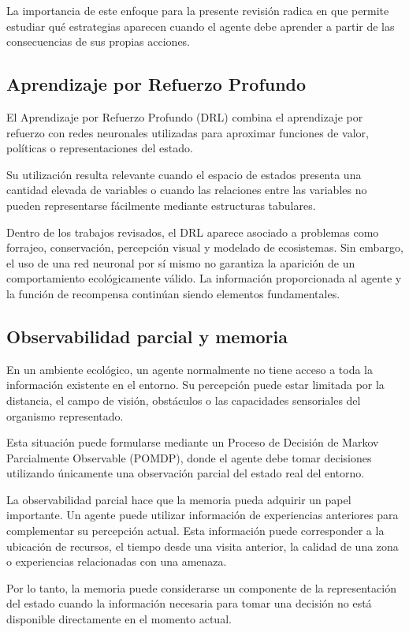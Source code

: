 \documentclass[conference]{IEEEtran}
\begin{document}
La importancia de este enfoque para la presente revisión radica en que
permite estudiar qué estrategias aparecen cuando el agente debe aprender
a partir de las consecuencias de sus propias acciones.

\subsection{Aprendizaje por Refuerzo Profundo}

El Aprendizaje por Refuerzo Profundo (DRL) combina el aprendizaje por
refuerzo con redes neuronales utilizadas para aproximar funciones de
valor, políticas o representaciones del estado.

Su utilización resulta relevante cuando el espacio de estados presenta
una cantidad elevada de variables o cuando las relaciones entre las
variables no pueden representarse fácilmente mediante estructuras
tabulares.

Dentro de los trabajos revisados, el DRL aparece asociado a problemas
como forrajeo, conservación, percepción visual y modelado de ecosistemas.
Sin embargo, el uso de una red neuronal por sí mismo no garantiza la
aparición de un comportamiento ecológicamente válido. La información
proporcionada al agente y la función de recompensa continúan siendo
elementos fundamentales.

\subsection{Observabilidad parcial y memoria}

En un ambiente ecológico, un agente normalmente no tiene acceso a toda la
información existente en el entorno. Su percepción puede estar limitada
por la distancia, el campo de visión, obstáculos o las capacidades
sensoriales del organismo representado.

Esta situación puede formularse mediante un Proceso de Decisión de Markov
Parcialmente Observable (POMDP), donde el agente debe tomar decisiones
utilizando únicamente una observación parcial del estado real del
entorno.

La observabilidad parcial hace que la memoria pueda adquirir un papel
importante. Un agente puede utilizar información de experiencias
anteriores para complementar su percepción actual. Esta información puede
corresponder a la ubicación de recursos, el tiempo desde una visita
anterior, la calidad de una zona o experiencias relacionadas con una
amenaza.

Por lo tanto, la memoria puede considerarse un componente de la
representación del estado cuando la información necesaria para tomar una
decisión no está disponible directamente en el momento actual.
\end{document}
